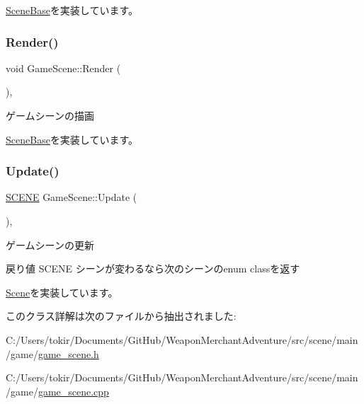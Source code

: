 \mbox{\hyperlink{class_scene_base_a24d7db43c819924dc8b07b436f6d3148}{Scene\+Base}}を実装しています。

\mbox{\label{class_game_scene_ae5ecfa81aecd5e959b038142640a1c7b}} 
\subsubsection{\texorpdfstring{Render()}{Render()}}
{\footnotesize\ttfamily void Game\+Scene\+::\+Render (\begin{DoxyParamCaption}{ }\end{DoxyParamCaption})\hspace{0.3cm}{\ttfamily [final]}, {\ttfamily [virtual]}}



ゲームシーンの描画 



\mbox{\hyperlink{class_scene_base_ad981674ce731ea267f398e889bbb9dc3}{Scene\+Base}}を実装しています。

\mbox{\label{class_game_scene_a2d4c44e96484af17ed3f6fb0402ebafd}} 
\subsubsection{\texorpdfstring{Update()}{Update()}}
{\footnotesize\ttfamily \mbox{\hyperlink{scene__base_8h_a24cee5343fb9d0706ead6e8601f363be}{S\+C\+E\+NE}} Game\+Scene\+::\+Update (\begin{DoxyParamCaption}{ }\end{DoxyParamCaption})\hspace{0.3cm}{\ttfamily [final]}, {\ttfamily [virtual]}}



ゲームシーンの更新 

\begin{DoxyReturn}{戻り値}
S\+C\+E\+NE シーンが変わるなら次のシーンのenum classを返す 
\end{DoxyReturn}


\mbox{\hyperlink{class_scene_acb50f8104e5a7cfecbdececa7d5f1b39}{Scene}}を実装しています。



このクラス詳解は次のファイルから抽出されました\+:\begin{DoxyCompactItemize}
\item 
C\+:/\+Users/tokir/\+Documents/\+Git\+Hub/\+Weapon\+Merchant\+Adventure/src/scene/main/game/\mbox{\hyperlink{game__scene_8h}{game\+\_\+scene.\+h}}\item 
C\+:/\+Users/tokir/\+Documents/\+Git\+Hub/\+Weapon\+Merchant\+Adventure/src/scene/main/game/\mbox{\hyperlink{game__scene_8cpp}{game\+\_\+scene.\+cpp}}\end{DoxyCompactItemize}
